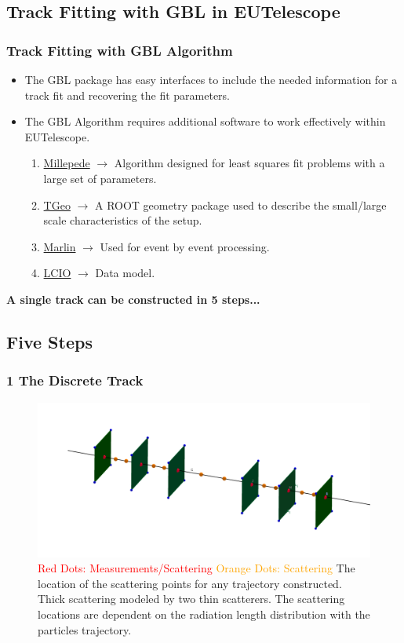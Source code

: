 \documentclass{beamer}
\begin{document}
\subsection{Track Fitting with GBL in EUTelescope}
\begin{frame}
\frametitle{Track Fitting with GBL Algorithm}
\begin{itemize}
\item The GBL package has easy interfaces to include the needed information for a track fit and recovering the fit parameters.
\item The GBL Algorithm requires additional software to work effectively within EUTelescope. 
\begin{enumerate}
	\item \href{http://www.desy.de/~blobel/mptalks.html}{Millepede}  $\rightarrow$ Algorithm designed for least squares fit problems with a large set of parameters.
	\item \href{ftp://root.cern.ch/root/doc/18Geometry.pdf}{TGeo} $\rightarrow$ A ROOT geometry package used to describe the small/large scale characteristics of the setup.
	\item \href{http://ilcsoft.desy.de/portal/software_packages/marlin/|}{Marlin} $\rightarrow$ Used for event by event processing. 
	\item \href{http://ilcsoft.desy.de/portal/software_packages/lcio/}{LCIO} $\rightarrow$ Data model. 
\end{enumerate}
\end{itemize}
\vspace{10pt}
\textbf{A single track can be constructed in 5 steps...} 
\end{frame}
\subsection{Five Steps}
\begin{frame}
\frametitle{\textbf{1} The Discrete Track}
\begin{figure}
\label{Scat}
\includegraphics[scale=0.60]{pics/meas-scat-jac-link.png}	
\caption{\textcolor{red}{Red Dots: Measurements/Scattering} \newline \textcolor{orange}{Orange Dots: Scattering} \newline The location of the scattering points for any trajectory constructed. Thick scattering modeled by two thin scatterers. The scattering locations are dependent on the radiation length distribution with the particles trajectory.}
\end{figure}
\end{frame}
\end{document}
